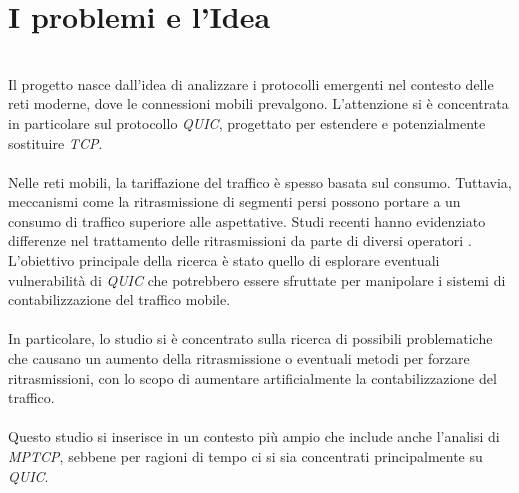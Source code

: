 \section{I problemi e l'Idea}
\label{Problema}
~\\
\indent Il progetto nasce dall'idea di analizzare i protocolli emergenti nel contesto delle reti moderne, dove le connessioni mobili prevalgono. 
L'attenzione si è concentrata in particolare sul protocollo \emph{QUIC}, progettato per estendere e potenzialmente sostituire \emph{TCP}.
\\\\
Nelle reti mobili, la tariffazione del traffico è spesso basata sul consumo. 
Tuttavia, meccanismi come la ritrasmissione di segmenti persi possono portare a un consumo di traffico superiore alle aspettative. 
Studi recenti hanno evidenziato differenze nel trattamento delle ritrasmissioni da parte di diversi operatori \cite{article:cellular}.
L'obiettivo principale della ricerca è stato quello di esplorare eventuali vulnerabilità di \emph{QUIC} che potrebbero essere sfruttate per manipolare i sistemi di contabilizzazione del traffico mobile.
\\\\
In particolare, lo studio si è concentrato sulla ricerca di possibili problematiche che causano un aumento della ritrasmissione o eventuali metodi per forzare ritrasmissioni, con lo scopo di aumentare artificialmente la contabilizzazione del traffico.
\\\\
Questo studio si inserisce in un contesto più ampio che include anche l'analisi di \emph{MPTCP}, sebbene per ragioni di tempo ci si sia concentrati principalmente su \emph{QUIC}. 


